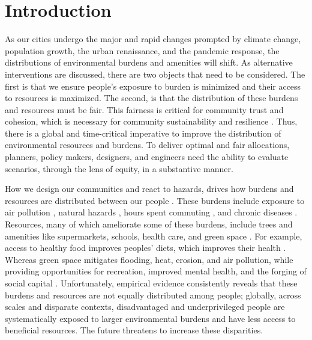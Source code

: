 \documentclass[final,3p,times,onecolumn,sort&compress]{elsarticle}
\begin{document}
\section{Introduction}
As our cities undergo the major and rapid changes prompted by climate change, population growth, the urban renaissance, and the pandemic response, the distributions of environmental burdens and amenities will shift.
As alternative interventions are discussed, there are two objects that need to be considered.
The first is that we ensure people's exposure to burden is minimized and their access to resources is maximized.
The second, is that the distribution of these burdens and resources must be fair.
This fairness is critical for community trust and cohesion, which is necessary for community sustainability and resilience \citep{Dempsey2011-og, Cutter2008-NJ, Logan2020-vj}.
Thus, there is a global and time-critical imperative to improve the distribution of environmental resources and burdens.
To deliver optimal and fair allocations, planners, policy makers, designers, and engineers need the ability to evaluate scenarios, through the lens of equity, in a substantive manner.

How we design our communities and react to hazards, drives how burdens and resources are distributed between our people \citep{Wilson2008-yk}.
These burdens include exposure to air pollution \cite{Maguire2011-fi, Sheriff2020-ge}, natural hazards \citep{Burby2000-qe, Saunders2007-of}, hours spent commuting \citep{Frumkin2004-yi}, and chronic diseases \citep{Lopez2006-jb}.
Resources, many of which ameliorate some of these burdens, include trees \citep{Schwarz2015-fs} and amenities like supermarkets, schools, health care, and green space \citep{Logan2019-fr, Nesbitt2019-sk, Pacione1989-ui, Apparicio2007-di, Whitehead2019-tf}.
For example, access to healthy food improves peoples' diets, which improves their health \citep{Garcia2020-xt, Kolak2018-az}.
Whereas green space mitigates flooding, heat, erosion, and air pollution, while providing opportunities for recreation, improved mental health, and the forging of social capital \citep{Dempsey2011-og, Astell-Burt2013-og,Kazmierczak2011-ot, Norton2015-vv}.
Unfortunately, empirical evidence consistently reveals that these burdens and resources are not equally distributed among people;
globally, across scales and disparate contexts, disadvantaged and underprivileged people are systematically exposed to larger environmental burdens and have less access to beneficial resources.
The future threatens to increase these disparities.
\end{document}
